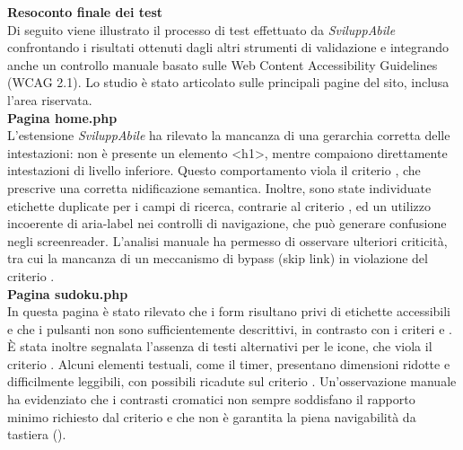 \vspace{0.8cm}

\noindent \textbf{Resoconto finale dei test}\\
\noindent Di seguito viene illustrato il processo di test effettuato da \textit{SviluppAbile} confrontando i risultati ottenuti dagli altri strumenti di validazione e integrando anche un controllo manuale basato sulle Web Content Accessibility Guidelines (WCAG 2.1). Lo studio è stato articolato sulle principali pagine del sito, inclusa l’area riservata.\\

\noindent \textbf{Pagina home.php}\\
L’estensione \textit{SviluppAbile} ha rilevato la mancanza di una gerarchia corretta delle intestazioni: non è presente un elemento <h1>, mentre compaiono direttamente intestazioni di livello inferiore. Questo comportamento viola il criterio {}, che prescrive una corretta nidificazione semantica. Inoltre, sono state individuate etichette duplicate per i campi di ricerca, contrarie al criterio {}, ed un utilizzo incoerente di aria-label nei controlli di navigazione, che può generare confusione negli screenreader.
L’analisi manuale ha permesso di osservare ulteriori criticità, tra cui la mancanza di un meccanismo di bypass (skip link) in violazione del criterio {}.\\

\noindent \textbf{Pagina sudoku.php}\\
In questa pagina è stato rilevato che i form risultano privi di etichette accessibili e che i pulsanti non sono sufficientemente descrittivi, in contrasto con i criteri {} e {}. È stata inoltre segnalata l’assenza di testi alternativi per le icone, che viola il criterio {}. Alcuni elementi testuali, come il timer, presentano dimensioni ridotte e difficilmente leggibili, con possibili ricadute sul criterio {}.
Un’osservazione manuale ha evidenziato che i contrasti cromatici non sempre soddisfano il rapporto minimo richiesto dal criterio {} e che non è garantita la piena navigabilità da tastiera ({}).\\

